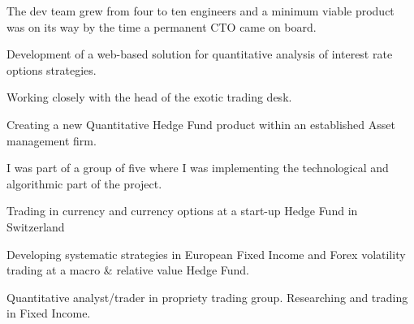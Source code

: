 The dev team grew from four to ten engineers and a minimum viable product was on its way by the time a permanent CTO came on board.


Development of a web-based solution for quantitative analysis of interest rate options strategies.

Working closely with the head of the exotic trading desk.


Creating a new Quantitative Hedge Fund product within an established Asset management firm.

I was part of a group of five where I was implementing the technological and algorithmic part of the project.


Trading in currency and currency options at a start-up Hedge Fund in Switzerland


Developing systematic strategies in European Fixed Income and Forex volatility trading at a macro \& relative value Hedge Fund.


Quantitative analyst/trader in propriety trading group. Researching and trading in Fixed Income.
